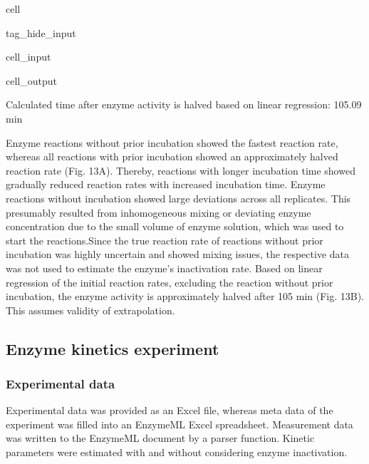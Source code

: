 \documentclass[letterpaper,12pt,english]{jupyterBook}
\begin{document}
\begin{sphinxuseclass}{cell}
\begin{sphinxuseclass}{tag_hide_input}
\begin{sphinxVerbatimInput}
\begin{sphinxuseclass}{cell_input}
\end{sphinxuseclass}\end{sphinxVerbatimInput}
\begin{sphinxVerbatimOutput}

\begin{sphinxuseclass}{cell_output}
\begin{sphinxVerbatim}[commandchars=\\\{\}]
Calculated time after enzyme activity is halved based on linear regression: 105.09 min
\end{sphinxVerbatim}

\noindent{}

\end{sphinxuseclass}\end{sphinxVerbatimOutput}

\end{sphinxuseclass}
\end{sphinxuseclass}
\sphinxAtStartPar
{}

\sphinxAtStartPar
Enzyme reactions without prior incubation showed the fastest reaction rate, whereas all reactions with prior incubation showed an approximately halved reaction rate (Fig. 13A). Thereby, reactions with longer incubation time showed gradually reduced reaction rates with increased incubation time. Enzyme reactions without incubation showed large deviations across all replicates. This presumably resulted from inhomogeneous mixing or deviating enzyme concentration due to the small volume of enzyme solution, which was used to start the reactions.Since the true reaction rate of reactions without prior incubation was highly uncertain and showed mixing issues, the respective data was not used to estimate the enzyme’s inactivation rate.
Based on linear regression of the initial reaction rates, excluding the reaction without prior incubation, the enzyme activity is approximately halved after 105 min (Fig. 13B). This assumes validity of extrapolation.


\subsection{Enzyme kinetics experiment}
\label{\detokenize{scenarios/enzyme_inactivation:enzyme-kinetics-experiment}}

\subsubsection{Experimental data}
\label{\detokenize{scenarios/enzyme_inactivation:id1}}
\sphinxAtStartPar
Experimental data was provided as an Excel file, whereas meta data of the experiment was filled into an EnzymeML Excel spreadsheet. Measurement data was written to the EnzymeML document by a parser function.
Kinetic parameters were estimated with and without considering enzyme inactivation.
\end{document}
